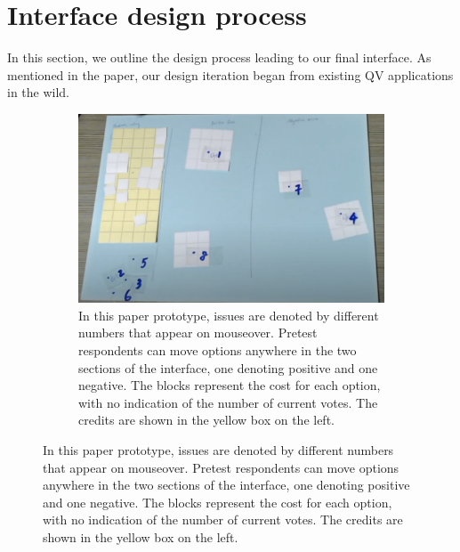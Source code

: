 \section{Interface design process}\label{apdx:design}
In this section, we outline the design process leading to our final interface. As mentioned in the paper, our design iteration began from existing QV applications in the wild.

\begin{figure}[ht]
    \centering
    \begin{subfigure}[b]{0.9\linewidth}
        \centering
        \includegraphics[width=\linewidth]{content/image/prototypes/1.2_paper_qv_single.png}
        \caption{In this paper prototype, issues are denoted by different numbers that appear on mouseover. Pretest respondents can move options anywhere in the two sections of the interface, one denoting positive and one negative. The blocks represent the cost for each option, with no indication of the number of current votes. The credits are shown in the yellow box on the left.}
        \label{fig:horizontal_paper}
    \end{subfigure}


\end{figure}
